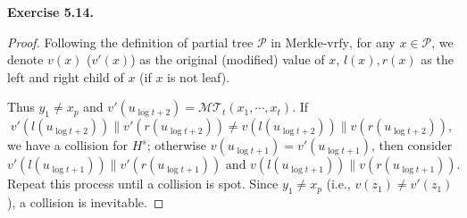 \documentclass[a4paper]{article}
\newtheorem*{proof}{Proof}
\newenvironment{exercise}[1]{
	\par
	\noindent\textbf{Exercise #1.}\quad
}{
	\par
	\bigskip
}
\newcommand{\Pcal}{\mathcal{P}}
\begin{document}
\begin{exercise}{5.14}
\begin{itemize}
\begin{proof}
            Following the definition of partial tree $\Pcal$ in $\mathrm{Merkle\text{-}vrfy}$,
            for any $x\in\Pcal$, we denote $v(x)$ ($v'(x)$) as the original (modified) value of $x$, 
            $l(x),r(x)$ as the left and right child of $x$ 
            (if $x$ is not leaf). 

            Thus $y_1\neq x_p$ and $v'(u_{\log t+2})=\mathcal{MT}_t(x_1,\cdots,x_t)$.
            If 
            $$v'(l(u_{\log t+2}))\|v'(r(u_{\log t+2}))\neq v(l(u_{\log t+2}))\|v(r(u_{\log t+2})),$$
            we have a collision for $H^s$; otherwise $v(u_{\log t+1})=v'(u_{\log t+1})$, then
            consider
            $$v'(l(u_{\log t+1}))\|v'(r(u_{\log t+1}))\text{ and }v(l(u_{\log t+1}))\|v(r(u_{\log t+1})).$$
            Repeat this process until a collision is spot.
            Since $y_1\neq x_p$ (i.e., $v(z_1)\neq v'(z_1)$), a collision is inevitable.
        \end{proof}
\end{itemize}
\end{exercise}
\end{document}

